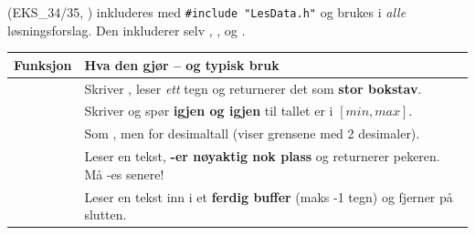 
\label{kap:lesdata}

 (EKS\_34/35, \href{https://frh.folk.ntnu.no/grprog/eksempler/LesData.h}{})
inkluderes med \lstinline|#include "LesData.h"| og brukes i \emph{alle} løsningsforslag.
Den inkluderer selv , ,  og .

\begin{center}
\begin{tabular}{@{}L{6.4cm}L{9.2cm}@{}}
\toprule
\textbf{Funksjon} & \textbf{Hva den gjør -- og typisk bruk} \\
\midrule
{} &
Skriver , leser \emph{ett} tegn og returnerer det som \textbf{stor bokstav}. \newline
{} \\
 \newline {} &
Skriver  og spør \textbf{igjen og igjen} til tallet er i $[\mathit{min}, \mathit{max}]$. \newline
{} \\
 \newline {} &
Som , men for desimaltall (viser grensene med 2 desimaler). \newline
{} \\
 &
Leser en tekst, \textbf{-er nøyaktig nok plass} og returnerer pekeren. Må -es senere! \newline
{} \\
 \newline {} &
Leser en tekst inn i et \textbf{ferdig buffer} (maks -1 tegn) og fjerner  på slutten. \newline
{} \\
\bottomrule
\end{tabular}
\end{center}

